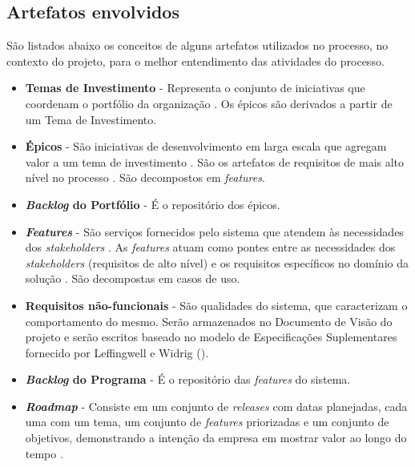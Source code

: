   
  \subsection{Artefatos envolvidos}
  
    São listados abaixo os conceitos de alguns artefatos utilizados no processo, no contexto do projeto,
    para o melhor entendimento das atividades do processo.
    
    \begin{itemize}
     
     \item \textbf{Temas de Investimento} - Representa o conjunto de iniciativas que coordenam o portfólio da organização \cite{leffingwell11}.
      Os épicos são derivados a partir de um Tema de Investimento.
     
     \item \textbf{Épicos} - São iniciativas de desenvolvimento em larga escala que agregam valor a um tema de investimento \cite{leffingwell11}.
     São os artefatos de requisitos de mais alto nível no processo \cite{leffingwell11}.
     São decompostos em \textit{features}.
     
     \item \textbf{\textit{Backlog} do Portfólio} - É o repositório dos épicos.
     
     \item \textbf{\textit{Features}} - São serviços fornecidos pelo sistema que atendem às necessidades dos
     \textit{stakeholders} \cite{leffingwell03}. As \textit{features} atuam como pontes entre as necessidades
     dos \textit{stakeholders} (requisitos de alto nível) e os requisitos específicos no domínio da solução \cite{leffingwell11}.
     São decompostas em casos de uso.
     
     \item \textbf{Requisitos não-funcionais} - São qualidades do sistema, que caracterizam o comportamento do mesmo.
      Serão armazenados no Documento de Visão do projeto e serão escritos baseado no modelo de Especificações Suplementares
      fornecido por Leffingwell e Widrig (\citeyear{leffingwell03}).
     
     \item \textbf{\textit{Backlog} do Programa} - É o repositório das \textit{features} do sistema.
     
     \item \textbf{\textit{Roadmap}} - Consiste em um conjunto de \textit{releases} com datas planejadas, cada uma com um tema,
     um conjunto de \textit{features} priorizadas e um conjunto de objetivos, demonstrando a intenção da empresa em mostrar valor ao
     longo do tempo \cite{leffingwell11}.
     

\end{itemize}
